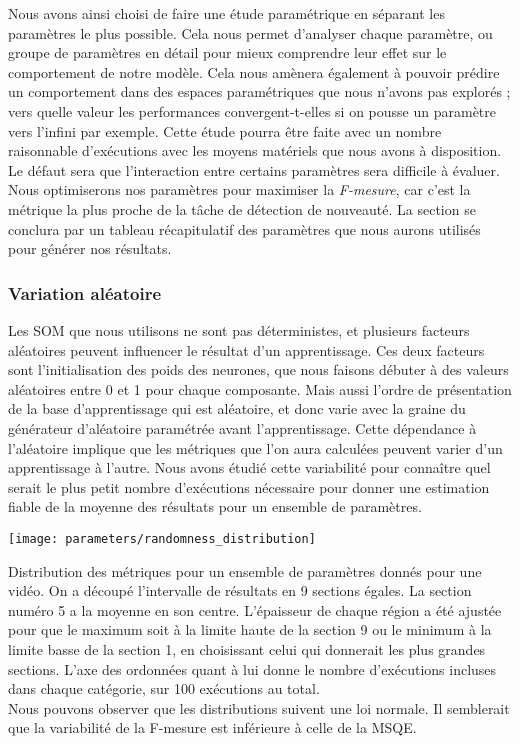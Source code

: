	Nous avons ainsi choisi de faire une étude paramétrique en séparant les paramètres le plus possible. Cela nous permet d'analyser chaque paramètre, ou groupe de paramètres en détail pour mieux comprendre leur effet sur le comportement de notre modèle. Cela nous amènera également à pouvoir prédire un comportement dans des espaces paramétriques que nous n'avons pas explorés ; vers quelle valeur les performances convergent-t-elles si on pousse un paramètre vers l'infini par exemple. Cette étude pourra être faite avec un nombre raisonnable d'exécutions avec les moyens matériels que nous avons à disposition. Le défaut sera que l'interaction entre certains paramètres sera difficile à évaluer. Nous optimiserons nos paramètres pour maximiser la \textit{F-mesure}, car c'est la métrique la plus proche de la tâche de détection de nouveauté. La section se conclura par un tableau récapitulatif des paramètres que nous aurons utilisés pour générer nos résultats.

	\subsubsection{Variation aléatoire}

	Les SOM que nous utilisons ne sont pas déterministes, et plusieurs facteurs aléatoires peuvent influencer le résultat d'un apprentissage. Ces deux facteurs sont l'initialisation des poids des neurones, que nous faisons débuter à des valeurs aléatoires entre 0 et 1 pour chaque composante. Mais aussi l'ordre de présentation de la base d'apprentissage qui est aléatoire, et donc varie avec la graine du générateur d'aléatoire paramétrée avant l'apprentissage. Cette dépendance à l'aléatoire implique que les métriques que l'on aura calculées peuvent varier d'un apprentissage à l'autre. Nous avons étudié cette variabilité pour connaître quel serait le plus petit nombre d'exécutions nécessaire pour donner une estimation fiable de la moyenne des résultats pour un ensemble de paramètres. 

	\begin{figureth}
		\texttt{[image: parameters/randomness\_distribution]}
		\caption[Effet de l'aléatoire sur les métriques]{Distribution des métriques pour un ensemble de paramètres donnés pour une vidéo. On a découpé l'intervalle de résultats en 9 sections égales. La section numéro 5 a la moyenne en son centre. L'épaisseur de chaque région a été ajustée pour que le maximum soit à la limite haute de la section 9 ou le minimum à la limite basse de la section 1, en choisissant celui qui donnerait les plus grandes sections. L'axe des ordonnées quant à lui donne le nombre d'exécutions incluses dans chaque catégorie, sur 100 exécutions au total.\\
		
		Nous pouvons observer que les distributions suivent une loi normale. Il semblerait que la variabilité de la F-mesure est inférieure à celle de la MSQE.}\label{fig:params:random}
	\end{figureth}

